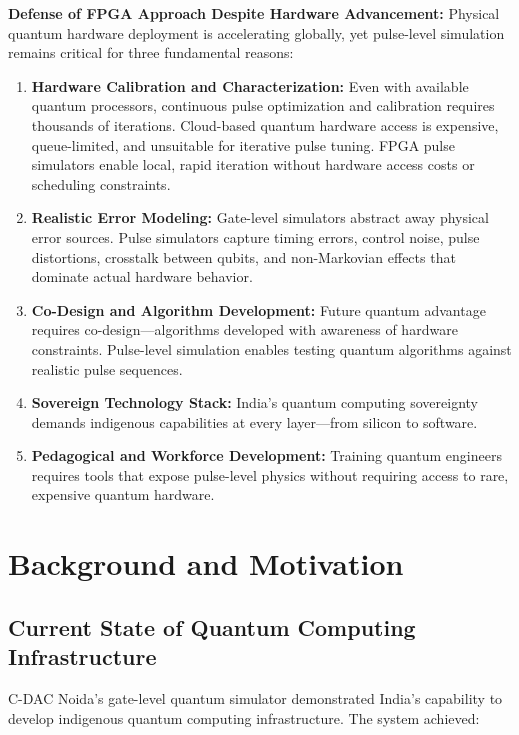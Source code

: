 \documentclass[12pt,a4paper]{article}
\begin{document}
\textbf{Defense of FPGA Approach Despite Hardware Advancement:} Physical quantum hardware deployment is accelerating globally, yet pulse-level simulation remains critical for three fundamental reasons:

\begin{enumerate}[noitemsep]
    \item \textbf{Hardware Calibration and Characterization:} Even with available quantum processors, continuous pulse optimization and calibration requires thousands of iterations. Cloud-based quantum hardware access is expensive, queue-limited, and unsuitable for iterative pulse tuning. FPGA pulse simulators enable local, rapid iteration without hardware access costs or scheduling constraints.
    
    \item \textbf{Realistic Error Modeling:} Gate-level simulators abstract away physical error sources. Pulse simulators capture timing errors, control noise, pulse distortions, crosstalk between qubits, and non-Markovian effects that dominate actual hardware behavior.
    
    \item \textbf{Co-Design and Algorithm Development:} Future quantum advantage requires co-design—algorithms developed with awareness of hardware constraints. Pulse-level simulation enables testing quantum algorithms against realistic pulse sequences.
    
    \item \textbf{Sovereign Technology Stack:} India's quantum computing sovereignty demands indigenous capabilities at every layer—from silicon to software.
    
    \item \textbf{Pedagogical and Workforce Development:} Training quantum engineers requires tools that expose pulse-level physics without requiring access to rare, expensive quantum hardware.
\end{enumerate}

\newpage
\section{Background and Motivation}

\subsection{Current State of Quantum Computing Infrastructure}

C-DAC Noida's gate-level quantum simulator demonstrated India's capability to develop indigenous quantum computing infrastructure. The system achieved:
\end{document}
